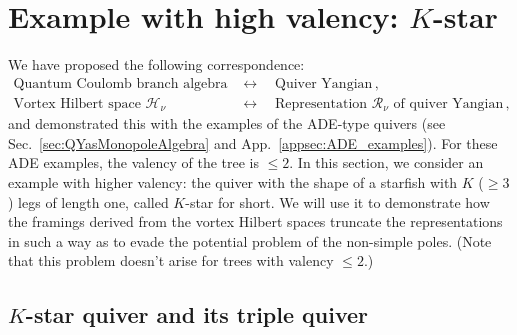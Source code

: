 \documentclass[12pt,a4paper]{article}
\renewcommand{\(}{\left(}
\renewcommand{\)}{\right)}
\renewcommand{\(}{\left(}
\renewcommand{\)}{\right)}
\begin{document}
 

\section{\texorpdfstring{Example with high valency: $K$-star}{Example with high valency: K-star}}
\label{sec:kleaf_example}
We have proposed the following correspondence:
\begin{equation}\label{eq:correspondence}
\begin{aligned}
\text{Quantum Coulomb branch algebra}\quad&\longleftrightarrow\quad \text{Quiver Yangian}\,,\\
\text{Vortex Hilbert space $\mathcal{H}_{\nu}$}\quad&\longleftrightarrow \quad\text{Representation $\mathcal{R}_{\nu}$ of quiver Yangian}\,,
\end{aligned}
\end{equation}
and demonstrated this with the examples of the ADE-type quivers (see Sec.~\ref{sec:QYasMonopoleAlgebra} and App.~\ref{appsec:ADE_examples}).
For these ADE examples, the valency of the tree is $\leq 2$.
In this section, we consider an example with higher valency: the quiver with the shape of a starfish with $K$ ($\geq 3$) legs of length one,  called $K$-star for short. 
We will use it to demonstrate how the framings derived from the vortex Hilbert spaces truncate the representations in such a way as to evade the potential problem of the non-simple poles. (Note that this problem doesn't arise for trees with valency $\leq 2$.)

\subsection{\texorpdfstring{$K$-star quiver and its triple quiver}{K-star quiver and its triple quiver}}
\end{document}
